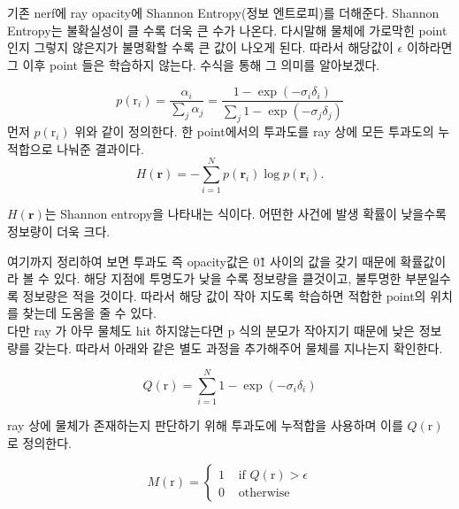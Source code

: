 \documentclass{vipweekly}
\begin{document}
기존 nerf에 ray opacity에 Shannon Entropy(정보 엔트로피)를 더해준다.
Shannon Entropy는 불확실성이 클 수록 더욱 큰 수가 나온다. 
다시말해 물체에 가로막힌 point인지 그렇지 않은지가 불명확할 수록 큰 값이 나오게 된다. 
따라서 해당값이 $\epsilon$ 이하라면 그 이후 point 들은 학습하지 않는다. 
수식을 통해 그 의미를 알아보겠다.

\begin{equation}
    p\left(\mathrm{r}_i\right)=\frac{\alpha_i}{\sum_j \alpha_j}=\frac{1-\exp \left(-\sigma_i \delta_i\right)}{\sum_j 1-\exp \left(-\sigma_j \delta_j\right)}    \label{eq:nerf_continuous}
\end{equation}
먼저 $p\left(\mathrm{r}_i\right)$ 위와 같이 정의한다. 한 point에서의 투과도를 ray 상에 모든 투과도의 누적합으로 나눠준 결과이다.\\


\begin{equation}
    H(\mathbf{r})=-\sum_{i=1}^N p\left(\mathbf{r}_i\right) \log p\left(\mathbf{r}_i\right).
    \label{eq:nerf_continuous}
\end{equation}

$H(\mathbf{r})$는 Shannon entropy을 나타내는 식이다. 어떤한 사건에 발생 확률이 낮을수록 정보량이 더욱 크다. 


여기까지 정리하여 보면 투과도 즉 opacity값은 0\~1 사이의 값을 갖기 때문에 확률값이라 볼 수 있다. 
해당 지점에 투명도가 낮을 수록 정보량을 클것이고, 불투명한 부분일수록  정보량은 적을 것이다. 
따라서 해당 값이 작아 지도록 학습하면 적합한 point의 위치를 찾는데 도움을 줄 수 있다.\\


다만 ray 가 아무 물체도 hit 하지않는다면 p 식의 분모가 작아지기 때문에 낮은 정보량를 갖는다. 
따라서 아래와 같은 별도 과정을 추가해주어 물체를 지나는지 확인한다.

\begin{equation}
    Q(\mathrm{r})=\sum_{i=1}^N 1-\exp \left(-\sigma_i \delta_i\right)
\end{equation}

ray 상에 물체가 존재하는지 판단하기 위해 투과도에 누적합을 사용하며 이를  $Q(\mathrm{r})$로 정의한다.

\begin{equation}
    M(\mathrm{r})= \begin{cases}1 & \text { if } Q(\mathrm{r})>\epsilon \\ 0 & \text { otherwise }\end{cases}
\end{equation}
\end{document}
